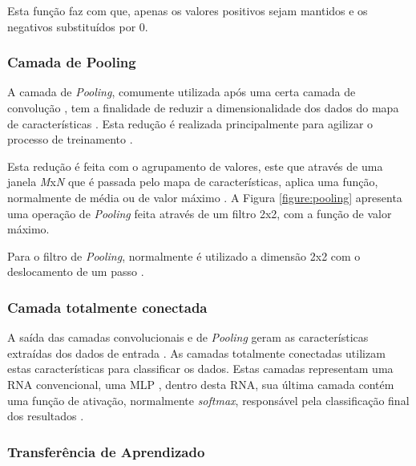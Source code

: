 \par Esta função faz com que, apenas os valores positivos sejam mantidos e os negativos substituídos por 0.

\subsubsection{Camada de Pooling}

\par A camada de \textit{Pooling}, comumente utilizada após uma certa camada de convolução \cite{Caroline2016}, tem a finalidade de reduzir a dimensionalidade dos dados do mapa de características \cite{Caroline2016}. Esta redução é realizada principalmente para agilizar o processo de treinamento \cite{Caroline2016}.

\par Esta redução é feita com o agrupamento de valores, este que através de uma janela \textit{M}x\textit{N} que é passada pelo mapa de características, aplica uma função, normalmente de média ou de valor máximo \cite{Amidi2018}. A Figura \ref{figure:pooling} apresenta uma operação de \textit{Pooling} feita através de um filtro 2x2, com a função de valor máximo.


\par Para o filtro de \textit{Pooling}, normalmente é utilizado a dimensão 2x2 com o deslocamento de um passo \cite{mnielsen2018}.

\subsubsection{Camada totalmente conectada}

\par A saída das camadas convolucionais e de \textit{Pooling} geram as características extraídas dos dados de entrada \cite{Carneiro2017}. As camadas totalmente conectadas utilizam estas características para classificar os dados. Estas camadas representam uma RNA convencional, uma MLP \cite{Haykin2001}, dentro desta RNA, sua última camada contém uma função de ativação, normalmente \textit{softmax}, responsável pela classificação final dos resultados \cite{Bishop2006}. 

\subsubsection{Transferência de Aprendizado}

